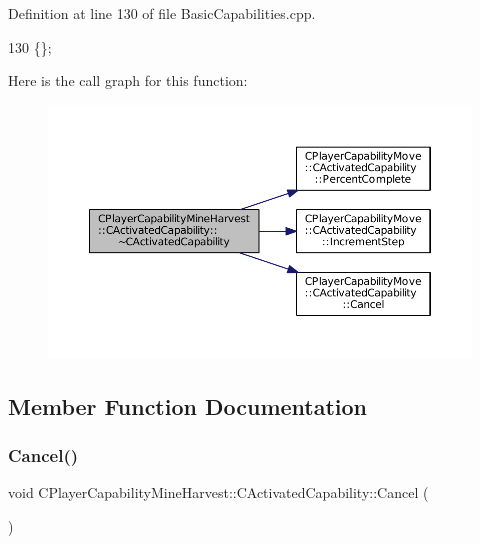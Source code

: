 Definition at line 130 of file Basic\+Capabilities.\+cpp.


\begin{DoxyCode}
130 \{\};
\end{DoxyCode}
Here is the call graph for this function\+:\nopagebreak
\begin{figure}[H]
\begin{center}
\leavevmode
\includegraphics[width=350pt]{classCPlayerCapabilityMineHarvest_1_1CActivatedCapability_a206562e670341a6eb24d0c5dc1bea976_cgraph}
\end{center}
\end{figure}


\subsection{Member Function Documentation}
\hypertarget{classCPlayerCapabilityMineHarvest_1_1CActivatedCapability_ab1fef064fbc085a6419b5a822e787614}{}\label{classCPlayerCapabilityMineHarvest_1_1CActivatedCapability_ab1fef064fbc085a6419b5a822e787614} 
\subsubsection{\texorpdfstring{Cancel()}{Cancel()}}
{\footnotesize\ttfamily void C\+Player\+Capability\+Mine\+Harvest\+::\+C\+Activated\+Capability\+::\+Cancel (\begin{DoxyParamCaption}{ }\end{DoxyParamCaption})\hspace{0.3cm}{\ttfamily [virtual]}}



